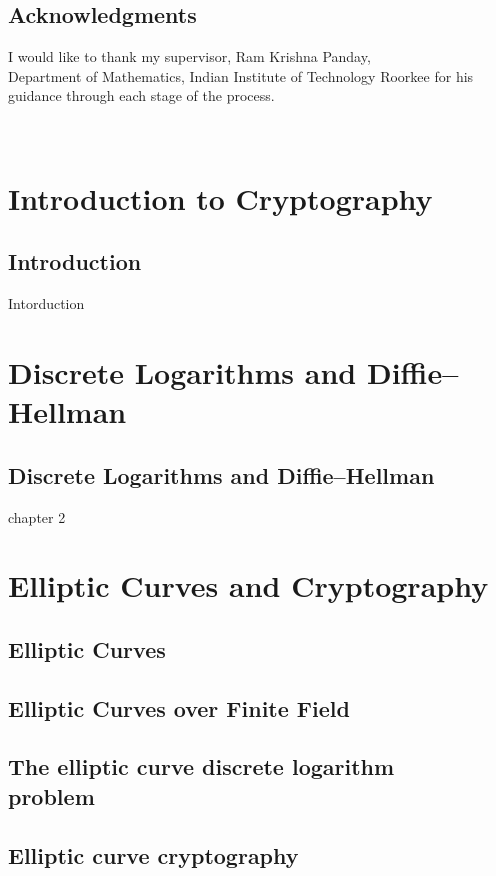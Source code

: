\documentclass[12pt,a4paper]{report}
\begin{document}
	\section*{Acknowledgments}
	I would like to thank my supervisor, Ram Krishna Panday,\\Department
of Mathematics, Indian Institute of Technology Roorkee for his guidance through each stage of the process. 
	\cleardoublepage	
	
	
	\tableofcontents
	\thispagestyle{empty}
	\cleardoublepage	
	\
	\setcounter{page}{1}
	
	\chapter{Introduction to Cryptography}
	\section{Introduction}
	Intorduction
	\cleardoublepage	
	\chapter{Discrete Logarithms and Diﬃe–Hellman}
	\section{Discrete Logarithms and Diﬃe–Hellman}
	chapter 2
	\cleardoublepage
	\chapter{Elliptic Curves and Cryptography}
	\section{Elliptic Curves}
	\section{Elliptic Curves over Finite Field}
	\section{The elliptic curve discrete logarithm \\ problem}
	\section{Elliptic curve cryptography}
	\cleardoublepage	
	

	\cite{hoffstein2008introduction}
	
	
	
	
	 
	
\end{document}
